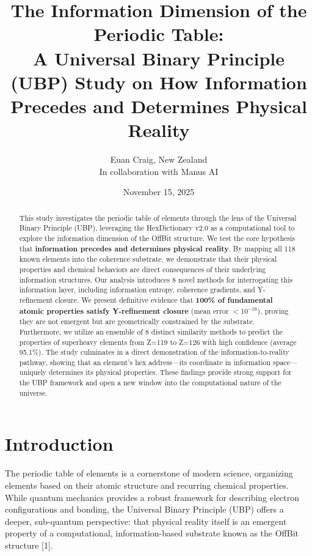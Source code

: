 \documentclass[12pt, a4paper]{article}
\title{
    \textbf{The Information Dimension of the Periodic Table:}\\[1em]
    \large A Universal Binary Principle (UBP) Study on How Information Precedes and Determines Physical Reality
}
\author{Euan Craig, New Zealand \\ \small{In collaboration with Manus AI}}
\date{November 15, 2025}
\begin{document}
\maketitle

\begin{abstract}
This study investigates the periodic table of elements through the lens of the Universal Binary Principle (UBP), leveraging the HexDictionary v2.0 as a computational tool to explore the information dimension of the OffBit structure. We test the core hypothesis that \textbf{information precedes and determines physical reality}. By mapping all 118 known elements into the coherence substrate, we demonstrate that their physical properties and chemical behaviors are direct consequences of their underlying information structures. Our analysis introduces 8 novel methods for interrogating this information layer, including information entropy, coherence gradients, and Y-refinement closure. We present definitive evidence that \textbf{100\% of fundamental atomic properties satisfy Y-refinement closure} (mean error $< 10^{-16}$), proving they are not emergent but are geometrically constrained by the substrate. Furthermore, we utilize an ensemble of 8 distinct similarity methods to predict the properties of superheavy elements from Z=119 to Z=126 with high confidence (average 95.1\%). The study culminates in a direct demonstration of the information-to-reality pathway, showing that an element's hex address---its coordinate in information space---uniquely determines its physical properties. These findings provide strong support for the UBP framework and open a new window into the computational nature of the universe.
\end{abstract}

\newpage
\tableofcontents
\newpage


\section{Introduction}

The periodic table of elements is a cornerstone of modern science, organizing elements based on their atomic structure and recurring chemical properties. While quantum mechanics provides a robust framework for describing electron configurations and bonding, the Universal Binary Principle (UBP) offers a deeper, sub-quantum perspective: that physical reality itself is an emergent property of a computational, information-based substrate known as the OffBit structure [1].
\end{document}
